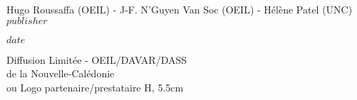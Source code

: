 \begin{titlepage}
\begin{minipage}[2cm]{16cm}
\begin{adjustwidth}{0.5cm}{1cm}
            {\fontsize{12}{14}\selectfont
            \color{grey_color}
            Hugo Roussaffa (OEIL) - J-F. N’Guyen Van Soc (OEIL) - Hélène Patel (UNC) \\
            $publisher$\\
            }
    
            {\fontsize{12}{8}\selectfont
            \color{date_color}
            $date$\\
            }

        \end{adjustwidth}
    \end{minipage}


    \begin{minipage}[1cm]{16cm}
        \begin{adjustwidth}{-0.4cm}{1cm} 
            \vspace{3.4cm}
            {\fontsize{11}{13}\selectfont
            \color{version_color}
            Diffusion Limitée - OEIL/DAVAR/DASS \\ de la Nouvelle-Calédonie\\ ou Logo partenaire/prestataire H, 5.5cm
            }
        \end{adjustwidth}
    \end{minipage}

\end{titlepage}

